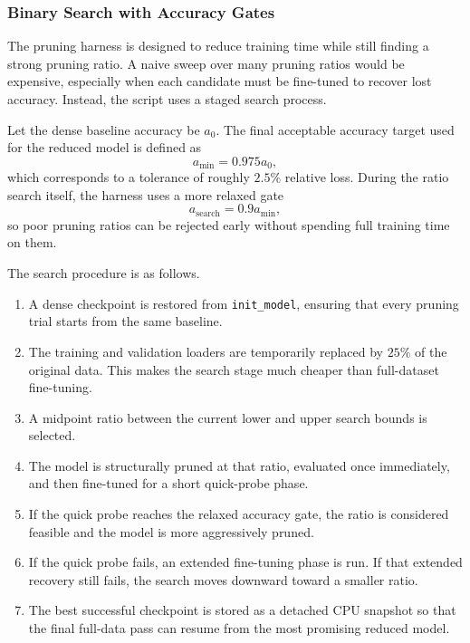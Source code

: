 \documentclass[conference]{IEEEtran}
\begin{document}
\subsubsection{Binary Search with Accuracy Gates}
The pruning harness is designed to reduce training time while still finding a strong pruning ratio. A naive sweep over many pruning ratios would be expensive, especially when each candidate must be fine-tuned to recover lost accuracy. Instead, the script uses a staged search process.

Let the dense baseline accuracy be $a_0$. The final acceptable accuracy target used for the reduced model is defined as
\begin{equation}
a_{\min} = 0.975 a_0,
\end{equation}
which corresponds to a tolerance of roughly \(2.5\%\) relative loss. During the ratio search itself, the harness uses a more relaxed gate
\begin{equation}
a_{\text{search}} = 0.9 a_{\min},
\end{equation}
so poor pruning ratios can be rejected early without spending full training time on them.

The search procedure is as follows.
\begin{enumerate}
\item A dense checkpoint is restored from \texttt{init\_model}, ensuring that every pruning trial starts from the same baseline.
\item The training and validation loaders are temporarily replaced by \(25\%\) of the original data. This makes the search stage much cheaper than full-dataset fine-tuning.
\item A midpoint ratio between the current lower and upper search bounds is selected.
\item The model is structurally pruned at that ratio, evaluated once immediately, and then fine-tuned for a short quick-probe phase.
\item If the quick probe reaches the relaxed accuracy gate, the ratio is considered feasible and the model is more aggressively pruned.
\item If the quick probe fails, an extended fine-tuning phase is run. If that extended recovery still fails, the search moves downward toward a smaller ratio.
\item The best successful checkpoint is stored as a detached CPU snapshot so that the final full-data pass can resume from the most promising reduced model.
\end{enumerate}
\end{document}
